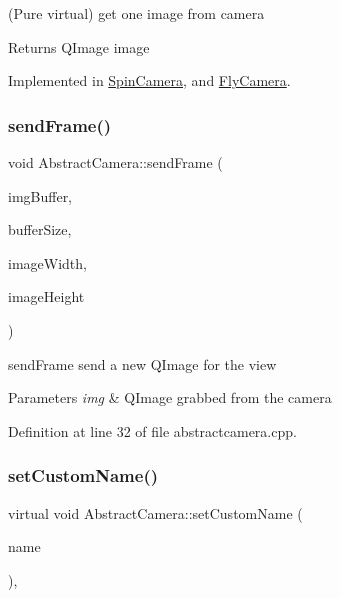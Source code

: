 (Pure virtual) get one image from camera 

\begin{DoxyReturn}{Returns}
Q\+Image image 
\end{DoxyReturn}


Implemented in \mbox{\hyperlink{class_spin_camera_af93d61657150a85134a6193fed344442}{Spin\+Camera}}, and \mbox{\hyperlink{class_fly_camera_a1c875e383a5a500a6a099a73fb3c54e3}{Fly\+Camera}}.

\mbox{\label{class_abstract_camera_a75a673fee75a95e52adf4a15cd5310c4}} 
\subsubsection{\texorpdfstring{sendFrame()}{sendFrame()}}
{\footnotesize\ttfamily void Abstract\+Camera\+::send\+Frame (\begin{DoxyParamCaption}\item[{void $\ast$}]{img\+Buffer,  }\item[{unsigned int}]{buffer\+Size,  }\item[{unsigned int}]{image\+Width,  }\item[{unsigned int}]{image\+Height }\end{DoxyParamCaption})\hspace{0.3cm}{\ttfamily [protected]}}



send\+Frame send a new Q\+Image for the view 


\begin{DoxyParams}{Parameters}
{\em img} & Q\+Image grabbed from the camera \\
\hline
\end{DoxyParams}


Definition at line 32 of file abstractcamera.\+cpp.

\mbox{\label{class_abstract_camera_adb6f411fe49721c570128ef51013cf1e}} 
\subsubsection{\texorpdfstring{setCustomName()}{setCustomName()}}
{\footnotesize\ttfamily virtual void Abstract\+Camera\+::set\+Custom\+Name (\begin{DoxyParamCaption}\item[{Q\+String}]{name }\end{DoxyParamCaption})\hspace{0.3cm}{\ttfamily [inline]}, {\ttfamily [virtual]}}



